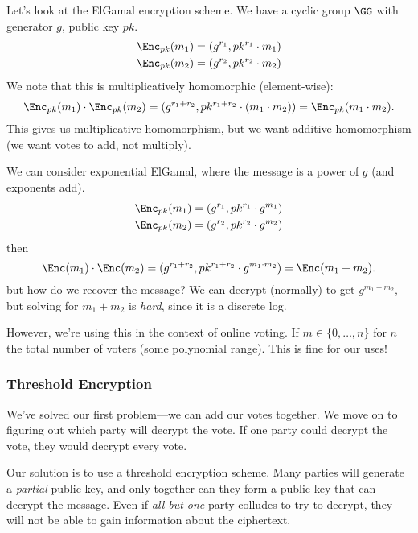 \begin{example}
    Let's look at the ElGamal encryption scheme. We have a cyclic group $\GG$ with generator $g$, public key $pk$.
    \begin{align*}
        \Enc_{pk}(m_1) & =(g^{r_1}, pk^{r_1}\cdot m_1) \\
        \Enc_{pk}(m_2) & =(g^{r_2}, pk^{r_2}\cdot m_2)
    \end{align*}
    We note that this is multiplicatively homomorphic (element-wise):
    \[\Enc_{pk}(m_1)\cdot \Enc_{pk}(m_2) = (g^{r_1 + r_2}, pk^{r_1 + r_2}\cdot (m_1\cdot m_2)) = \Enc_{pk}(m_1\cdot m_2).\]
    This gives us multiplicative homomorphism, but we want additive homomorphism (we want votes to add, not multiply).

    We can consider exponential ElGamal, where the message is a power of $g$ (and exponents add).
    \begin{align*}
        \Enc_{pk}(m_1) & =(g^{r_1}, pk^{r_1}\cdot g^{m_1}) \\
        \Enc_{pk}(m_2) & =(g^{r_2}, pk^{r_2}\cdot g^{m_2})
    \end{align*}
    then
    \[\Enc(m_1)\cdot \Enc(m_2) = (g^{r_1 + r_2}, pk^{r_1 + r_2}\cdot g^{m_1\cdot m_2}) = \Enc(m_1 + m_2).\]
    but how do we recover the message? We can decrypt (normally) to get $g^{m_1 + m_2}$, but solving for $m_1 + m_2$ is \emph{hard}, since it is a discrete log.

    However, we're using this in the context of online voting. If $m\in \{0, \dots, n\}$ for $n$ the total number of voters (some polynomial range). This is fine for our uses!
\end{example}

\subsubsection{Threshold Encryption}
We've solved our first problem---we can add our votes together. We move on to figuring out which party will decrypt the vote. If one party could decrypt the vote, they would decrypt every vote.

Our solution is to use a threshold encryption scheme. Many parties will generate a \emph{partial} public key, and only together can they form a public key that can decrypt the message. Even if \emph{all but one} party colludes to try to decrypt, they will not be able to gain information about the ciphertext.


